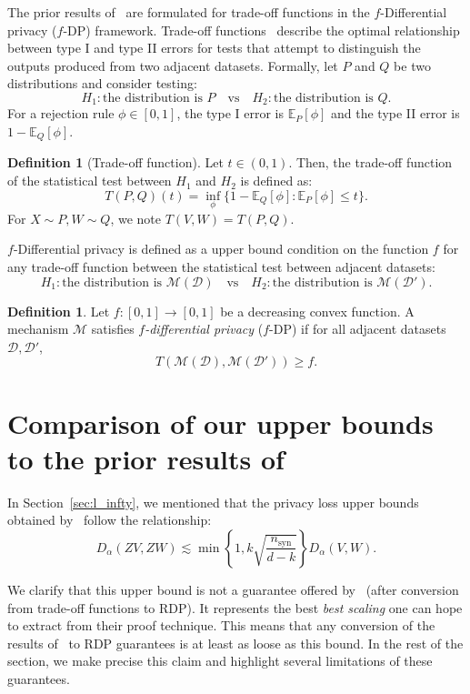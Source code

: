 \documentclass{article}
\theoremstyle{plain}
\theoremstyle{definition}
\newtheorem{definition}[theorem]{Definition}
\theoremstyle{remark}
\begin{document}
The prior results of~\citet{pierquin2025} are formulated for trade-off functions in the $f$-Differential privacy ($f$-DP) framework. Trade-off functions~\citep{Dong2019} describe the optimal relationship between type I and type II errors for tests that attempt to distinguish the outputs produced from two adjacent datasets. Formally, let $P$ and $Q$ be two distributions and consider testing:
\[H_1: \text{the distribution is } P \text{~~ vs ~~} H_2: \text{the distribution is } Q.\]
For a  rejection rule $\phi\in[0,1]$, the type I error is $\mathbb{E}_P[\phi]$ and the type II error is $1-\mathbb{E}_Q[\phi]$.
\begin{definition}[Trade-off function]
    Let $t \in (0,1)$. Then, the trade-off function of the statistical test between $H_1$ and $H_2$ is defined as:
    \[T(P,Q)(t) = \inf_{\phi} \{1-\mathbb{E}_Q[\phi]:\mathbb{E}_P[\phi] \leq t\}.\]
    For $X \sim P, W \sim Q$, we note $T(V,W) = T(P,Q)$.
\end{definition}

$f$-Differential privacy is defined as a upper bound condition on the function $f$ for any trade-off function between the statistical test between adjacent datasets:
\[H_1: \text{the distribution is } \mathcal{M}(\mathcal{D}) \text{~~ vs ~~} H_2: \text{the distribution is } \mathcal{M}(\mathcal{D}').\]

\begin{definition}
    Let $f:[0,1]\to[0,1]$ be a decreasing convex function. A mechanism $\mathcal{M}$ satisfies \emph{$f$-differential privacy} ($f$-DP) if for all adjacent datasets $\mathcal{D},\mathcal{D}'$,
    \[T(\mathcal{M}(\mathcal{D}),\mathcal{M}(\mathcal{D}')) \geq f.\]
\end{definition}
\section{Comparison of our upper bounds to the prior results of~\citet{pierquin2025}}
\label{app:comparison-prior-work}
In Section~\ref{sec:l_infty}, we mentioned that the privacy loss upper bounds obtained by~\citet{pierquin2025} follow the relationship:
\[D_\alpha(ZV,ZW) \lesssim \min\left\{1, k\sqrt{\frac{n_{\text{syn}}}{d-k}}\right\}D_\alpha(V,W).\]

We clarify that this upper bound is not a guarantee offered by~\citet{pierquin2025} (after conversion from trade-off functions to RDP). It represents the best \emph{best scaling} one can hope to extract from their proof technique. This means that any conversion of the results of~\citet{pierquin2025} to RDP guarantees is at least as loose as this bound. In the rest of the section, we make precise this claim and highlight several limitations of these guarantees. 
\end{document}
